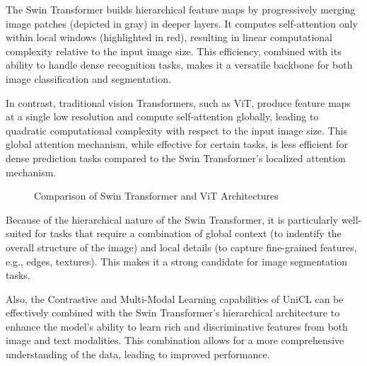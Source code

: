 The Swin Transformer builds hierarchical feature maps by progressively merging image patches (depicted in gray) in deeper layers. It computes self-attention only within local windows (highlighted in red), resulting in linear computational complexity relative to the input image size. This efficiency, combined with its ability to handle dense recognition tasks, makes it a versatile backbone for both image classification and segmentation.

In contrast, traditional vision Transformers, such as ViT, produce feature maps at a single low resolution and compute self-attention globally, leading to quadratic computational complexity with respect to the input image size. This global attention mechanism, while effective for certain tasks, is less efficient for dense prediction tasks compared to the Swin Transformer's localized attention mechanism.

\begin{figure}[htbp]
    \centering
    \caption{Comparison of Swin Transformer and ViT Architectures}
    \label{fig:swin_vs_vit_architecture}
\end{figure}

Because of the hierarchical nature of the Swin Transformer, it is particularly well-suited for tasks that require a combination of global context (to indentify the overall structure of the image) and local details (to capture fine-grained features, e.g., edges, textures). This makes it a strong candidate for image segmentation tasks.

Also, the Contrastive and Multi-Modal Learning capabilities of UniCL can be effectively combined with the Swin Transformer's hierarchical architecture to enhance the model's ability to learn rich and discriminative features from both image and text modalities. This combination allows for a more comprehensive understanding of the data, leading to improved performance.

